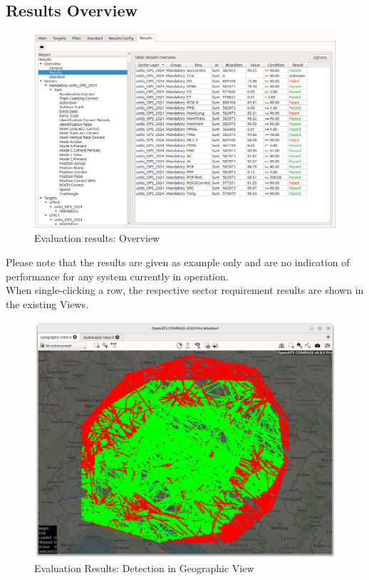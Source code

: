 \subsection{Results Overview}
\begin{figure}[H]
  \hspace*{-2cm}
    \includegraphics[width=18cm,frame]{figures/eval_results_overview.png}
  \caption{Evaluation results: Overview}
\end{figure}

Please note that the results are given as example only and are no indication of performance for any system currently in operation. \\

When single-clicking a row, the respective sector requirement results are shown in the existing Views.

\begin{figure}[H]
  \hspace*{-2.5cm}
    \includegraphics[width=19cm]{figures/geo_eval_detection.png}
  \caption{Evaluation Results: Detection in Geographic View}
\end{figure}

